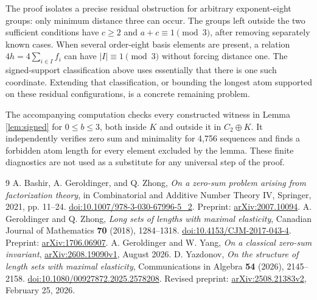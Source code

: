 \documentclass[11pt]{article}
\theoremstyle{definition}
\begin{document}
The proof isolates a precise residual obstruction for arbitrary exponent-eight groups: only minimum distance three can occur. The groups left outside the two sufficient conditions have $c\geq2$ and $a+c\equiv1\pmod3$, after removing separately known cases. When several order-eight basis elements are present, a relation $4h=4\sum_{i\in I}f_i$ can have $|I|\equiv1\pmod3$ without forcing distance one. The signed-support classification above uses essentially that there is one such coordinate. Extending that classification, or bounding the longest atom supported on these residual configurations, is a concrete remaining problem.

The accompanying computation checks every constructed witness in Lemma \ref{lem:signed} for $0\leq b\leq3$, both inside $K$ and outside it in $C_2\oplus K$. It independently verifies zero sum and minimality for 4,756 sequences and finds a forbidden atom length for every element excluded by the lemma. These finite diagnostics are not used as a substitute for any universal step of the proof.

\begin{thebibliography}{9}
 A. Bashir, A. Geroldinger, and Q. Zhong, \emph{On a zero-sum problem arising from factorization theory}, in Combinatorial and Additive Number Theory IV, Springer, 2021, pp. 11--24. \href{https://doi.org/10.1007/978-3-030-67996-5_2}{doi:10.1007/978-3-030-67996-5\_2}. Preprint: \href{https://arxiv.org/abs/2007.10094}{arXiv:2007.10094}.
 A. Geroldinger and Q. Zhong, \emph{Long sets of lengths with maximal elasticity}, Canadian Journal of Mathematics \textbf{70} (2018), 1284--1318. \href{https://doi.org/10.4153/CJM-2017-043-4}{doi:10.4153/CJM-2017-043-4}. Preprint: \href{https://arxiv.org/abs/1706.06907}{arXiv:1706.06907}.
 A. Geroldinger and W. Yang, \emph{On a classical zero-sum invariant}, \href{https://arxiv.org/abs/2608.19090v1}{arXiv:2608.19090v1}, August 2026.
 D. Yazdonov, \emph{On the structure of length sets with maximal elasticity}, Communications in Algebra \textbf{54} (2026), 2145--2158. \href{https://doi.org/10.1080/00927872.2025.2578208}{doi:10.1080/00927872.2025.2578208}. Revised preprint: \href{https://arxiv.org/abs/2508.21383v2}{arXiv:2508.21383v2}, February 25, 2026.
\end{thebibliography}
\end{document}
